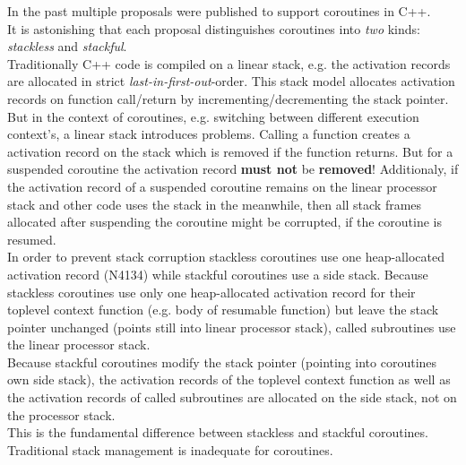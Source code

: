 In the past multiple proposals were published to support coroutines in C++.\\
It is astonishing that each proposal distinguishes coroutines into \emph{two}
kinds: \emph{stackless} and \emph{stackful}.\\
\newline
Traditionally C++ code is compiled on a linear stack, e.g. the activation
records are allocated in strict \emph{last-in-first-out}-order. This stack
model allocates activation records on function call/return by
incrementing/decrementing the stack pointer.\\
But in the context of coroutines, e.g. switching between different execution
context's, a linear stack introduces problems. Calling a function creates a
activation record on the stack which is removed if the function returns.
But for a suspended coroutine the activation record {\bfseries must not} be
{\bfseries removed}! Additionaly, if the activation record of a suspended
coroutine remains on the linear processor stack and other code uses the stack
in the meanwhile, then all stack frames allocated after suspending the coroutine
might be corrupted, if the coroutine is resumed.\\
In order to prevent stack corruption stackless coroutines use one heap-allocated
activation record (N4134) while stackful coroutines use a side stack. Because
stackless coroutines use only one heap-allocated activation record for their
toplevel context function (e.g. body of resumable function) but leave the stack
pointer unchanged (points still into linear processor stack), called subroutines
use the linear processor stack.\\
Because stackful coroutines modify the stack pointer (pointing into coroutines
own side stack), the activation records of the toplevel context function as well
as the activation records of called subroutines are allocated on the side stack,
not on the processor stack.\\
This is the fundamental difference between stackless and stackful coroutines.\\
\newline
Traditional stack management is inadequate for coroutines.
